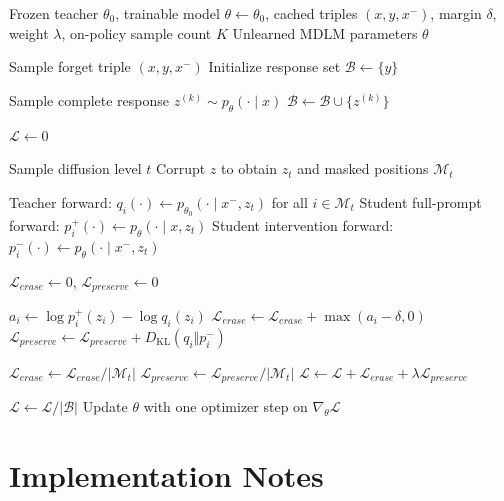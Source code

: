 \documentclass{article}
\begin{document}
\begin{algorithm}[t]
\caption{AURA-DLM training}
\label{alg:training}
\begin{algorithmic}[1]
\Require Frozen teacher $\theta_0$, trainable model $\theta\leftarrow\theta_0$, cached triples $(x,y,x^{-})$, margin $\delta$, weight $\lambda$, on-policy sample count $K$
\Ensure Unlearned MDLM parameters $\theta$

    \State Sample forget triple $(x,y,x^{-})$
    \State Initialize response set $\mathcal{B}\gets\{y\}$

        \State Sample complete response $z^{(k)}\sim p_{\theta}(\cdot\mid x)$
        \State $\mathcal{B}\gets\mathcal{B}\cup\{z^{(k)}\}$
    \EndFor

    \State $\mathcal{L}\gets 0$

        \State Sample diffusion level $t$
        \State Corrupt $z$ to obtain $z_t$ and masked positions $\mathcal{M}_t$

        \State Teacher forward: $q_i(\cdot)\gets p_{\theta_0}(\cdot\mid x^{-},z_t)$ for all $i\in\mathcal{M}_t$
        \State Student full-prompt forward: $p_i^{+}(\cdot)\gets p_{\theta}(\cdot\mid x,z_t)$
        \State Student intervention forward: $p_i^{-}(\cdot)\gets p_{\theta}(\cdot\mid x^{-},z_t)$

        \State $\mathcal{L}_{erase}\gets0$, $\mathcal{L}_{preserve}\gets0$

            \State $a_i\gets \log p_i^{+}(z_i)-\log q_i(z_i)$
            \State $\mathcal{L}_{erase}\gets\mathcal{L}_{erase}+\max(a_i-\delta,0)$
            \State $\mathcal{L}_{preserve}\gets\mathcal{L}_{preserve}+D_{\mathrm{KL}}(q_i\Vert p_i^{-})$
        \EndFor

        \State $\mathcal{L}_{erase}\gets\mathcal{L}_{erase}/|\mathcal{M}_t|$
        \State $\mathcal{L}_{preserve}\gets\mathcal{L}_{preserve}/|\mathcal{M}_t|$
        \State $\mathcal{L}\gets\mathcal{L}+\mathcal{L}_{erase}+\lambda\mathcal{L}_{preserve}$
    \EndFor

    \State $\mathcal{L}\gets\mathcal{L}/|\mathcal{B}|$
    \State Update $\theta$ with one optimizer step on $\nabla_\theta\mathcal{L}$
\EndWhile
\end{algorithmic}
\end{algorithm}

\section{Implementation Notes}
\end{document}
